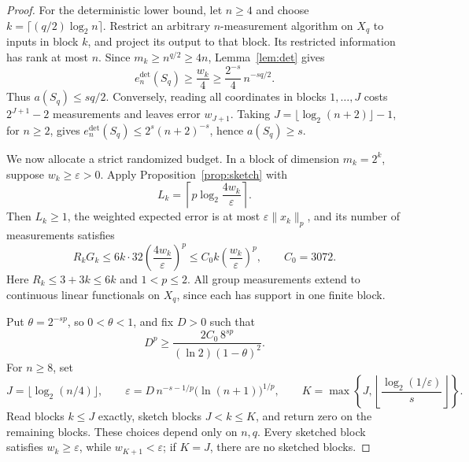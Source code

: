 \documentclass[11pt]{article}
\newcommand{\ed}{e^{\mathrm{det}}}
\begin{document}
\begin{proof}
For the deterministic lower bound, let \(n\ge4\) and choose
\(k=\lceil(q/2)\log_2n\rceil\). Restrict an arbitrary \(n\)-measurement
algorithm on \(X_q\) to inputs in block \(k\), and project its output to
that block. Its restricted information has rank at most \(n\).
Since \(m_k\ge n^{q/2}\ge4n\), Lemma~\ref{lem:det} gives
\begin{equation}\label{eq:global-det}
 \ed_n(S_q)\ge\frac{w_k}{4}
       \ge\frac{2^{-s}}4\,n^{-sq/2}.
\end{equation}
Thus \(a(S_q)\le sq/2\). Conversely, reading all coordinates in blocks
\(1,\ldots,J\) costs \(2^{J+1}-2\) measurements and leaves error
\(w_{J+1}\). Taking \(J=\lfloor\log_2(n+2)\rfloor-1\), for \(n\ge2\),
gives \(\ed_n(S_q)\le2^s(n+2)^{-s}\), hence \(a(S_q)\ge s\).

We now allocate a strict randomized budget. In a block of dimension
\(m_k=2^k\), suppose \(w_k\ge\varepsilon>0\). Apply
Proposition~\ref{prop:sketch} with
\[
 L_k=\left\lceil p\log_2\frac{4w_k}{\varepsilon}\right\rceil .
\]
Then \(L_k\ge1\), the weighted expected error is at most
\(\varepsilon\|x_k\|_p\), and its number of measurements satisfies
\begin{equation}\label{eq:block-cost}
 R_kG_k\le 6k\cdot32
       \left(\frac{4w_k}{\varepsilon}\right)^p
       \le C_0k\left(\frac{w_k}{\varepsilon}\right)^p,
 \qquad C_0=3072.
\end{equation}
Here \(R_k\le3+3k\le6k\) and \(1<p\le2\).
All group measurements extend to continuous linear functionals on \(X_q\),
since each has support in one finite block.

Put \(\theta=2^{-sp}\), so \(0<\theta<1\), and fix \(D>0\) such that
\begin{equation}\label{eq:D}
 D^p\ge\frac{2C_0\,8^{sp}}{(\ln2)(1-\theta)^2}.
\end{equation}
For \(n\ge8\), set
\[
 J=\lfloor\log_2(n/4)\rfloor,\qquad
 \varepsilon=D\,n^{-s-1/p}\bigl(\ln(n+1)\bigr)^{1/p},\qquad
 K=\max\left\{J,\left\lfloor\frac{\log_2(1/\varepsilon)}s
                                      \right\rfloor\right\}.
\]
Read blocks \(k\le J\) exactly, sketch blocks \(J<k\le K\), and return
zero on the remaining blocks. These choices depend only on \(n,q\).
Every sketched block satisfies \(w_k\ge\varepsilon\), while
\(w_{K+1}<\varepsilon\); if \(K=J\), there are no sketched blocks.


\end{proof}
\end{document}
